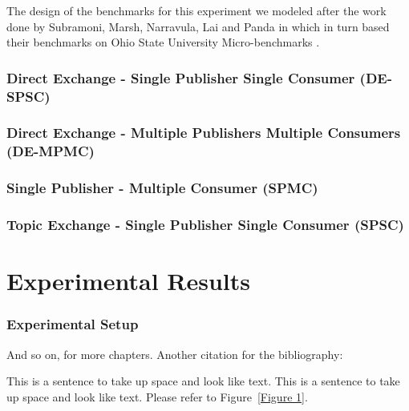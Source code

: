 \documentclass{thesis}
\begin{document}
The design of the benchmarks for this experiment we modeled after the work done by Subramoni, Marsh, Narravula, Lai and Panda in \cite{Subramoni} which in turn based their benchmarks on Ohio State University Micro-benchmarks .  

\subsection{Direct Exchange - Single Publisher Single Consumer (DE-SPSC)}
\subsection{Direct Exchange - Multiple Publishers Multiple Consumers (DE-MPMC)}
\subsection{Single Publisher - Multiple Consumer (SPMC)}
\subsection{Topic Exchange - Single Publisher Single Consumer (SPSC)}


\chapter{Experimental Results}
\subsection{Experimental Setup}
And so on, for more chapters.
Another citation for the bibliography:\cite{anotherbook}

   This is a sentence to take up space and look like text.
   This is a sentence to take up space and look like text.
   Please refer to Figure~\ref{Figure 1}.  %
\end{document}
